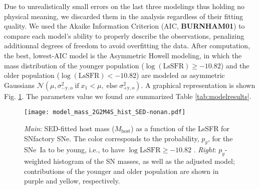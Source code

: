 \documentclass[../main/main.tex]{subfiles}
\begin{document}
Due to unrealistically small errors on the last three modelings thus holding no
physical meaning, we discarded them in the analysis regardless of their fitting
quality. We used the Akaike Information Criterion (AIC, \textbf{BURNHAM01}) to
compare each model's ability to properly describe the observations, penalizing
additionnal degrees of freedom to avoid overfitting the data. After computation,
the best, lowest-AIC model is the Asymmetric Howell modeling, in which the mass
distribution of the younger population ($\log(\mathrm{LsSFR}) \geq -10.82$) and
the older population ($\log(\mathrm{LsSFR}) < -10.82$) are modeled as asymmetric
Gaussians $\mathcal{N}\left(\mu, \sigma_{-\mathrm{y,o}}^2\; \text{if}
\;x_1<\mu,\; \text{else} \;\sigma_{+\mathrm{y,o}}^2\right)$. A graphical
representation is shown Fig. \ref{fig:massmodel}. The parameters value we found
are summarized Table \ref{tab:modelresults}.

\begin{figure}[]
    \centering
    \texttt{[image: model\_mass\_2G2M4S\_hist\_SED-nonan.pdf]}
    \caption{\textit{Main}: SED-fitted host mass ($M_\mathrm{host}$) as a
        function of the LsSFR for SNfactory SNe. The color corresponds to the
        probability, $p_y$, for the SNe~Ia to be young, i.e., to have
        $\log\mathrm{LsSFR} \geq -10.82$ \citep[see][]{rigault2020}.
    \textit{Right}: $p_y$-weighted histogram of the SN masses, as well as the
adjusted model; contributions of the younger and older population are shown in
purple and yellow, respectively.}
    \label{fig:massmodel}
\end{figure}
\end{document}
